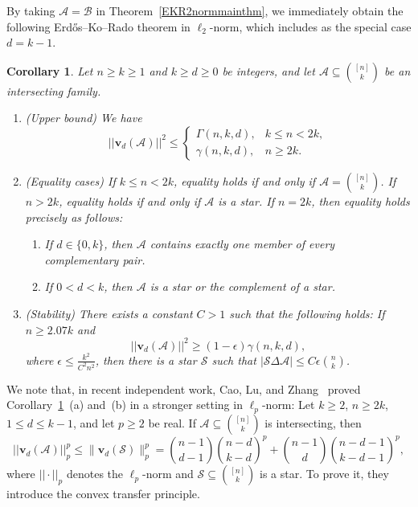 \documentclass[11pt]{article}
\numberwithin{equation}{section}
\newtheorem{corollary}[theorem]{Corollary}
\newtheorem{remark}[theorem]{Remark}
\def\A{\mathcal{A}}
\def\B{\mathcal{B}}
\def\S{\mathcal{S}}
\begin{document}
By taking $\A=\B$ in Theorem~\ref{EKR2normmainthm}, we immediately obtain the following
Erd\H{o}s--Ko--Rado theorem in $\ell_2$-norm, which includes
\cite[Theorem 1.3]{Brooks} as the special case $d=k-1$.

\begin{corollary}\label{EKR2normmainthm000}
Let $n \geq k\geq1$ and $k\geq d \geq 0$ be integers, and let
$\A \subseteq \binom{[n]}{k}$ be an intersecting family.
\begin{enumerate}[label={\rm (\alph*)}]
\item {\rm(Upper bound)} We have
\[
||\mathbf{v}_{d}(\A)||^2
\leq
\begin{cases}
\Gamma(n,k,d),& k\leq n<2k,\\
\gamma(n,k,d),& n\geq 2k.
\end{cases}
\]

\item {\rm(Equality cases)}
If $k\leq n<2k$, equality holds if and only if
$\A=\binom{[n]}k$.
If $n>2k$, equality holds if and only if $\A$ is a star.
If $n=2k$, then equality holds precisely as follows:
\begin{enumerate}[label={\rm (\roman*)}]
\item If $d\in\{0,k\}$, then $\A$ contains exactly one member of every complementary pair.

\item If $0<d<k$, then $\A$ is a star or the complement of a star.
\end{enumerate}

\item {\rm(Stability)} There exists a constant $C>1$ such that the following holds: If $n\geq 2.07k$ and
\[
||\mathbf{v}_{d}(\A)||^2 \geq (1-\epsilon)\gamma(n,k,d),
\]
where $\epsilon\leq \frac{k^2}{C^2 n ^2 }$, then there is a star
$\mathcal{S}$ such that
$|\mathcal{S} \Delta \A|\leq C \epsilon \binom{n}{k}$.
\end{enumerate}
\end{corollary}



We note that, in recent independent work,  Cao, Lu, and Zhang~\cite[Theorem 1.5]{Cao} proved Corollary~\ref{EKR2normmainthm000}~(a) and~(b) in a stronger setting in $\ell_p$-norm:
Let $k\geq2$, $n\geq2k$, $1\leq d\leq k-1$, and let $p\geq2$ be real.
If
$\A\subseteq\binom{[n]}{k}$ is intersecting, then
\begin{equation}\label{eq:all-level-main}
||\mathbf{v}_{d}(\A)||_p^p
\leq \|\mathbf{v}_{d}(\S)\|_p^p
=
\binom{n-1}{d-1}\binom{n-d}{k-d}^{\!p}
+
\binom{n-1}{d}\binom{n-d-1}{k-d-1}^{\!p},
\end{equation}
where $||\cdot||_p$ denotes the $\ell_p$-norm and $\S\subseteq \binom{[n]}{k}$ is a star.
To prove it, they introduce the convex transfer principle.
\end{document}
